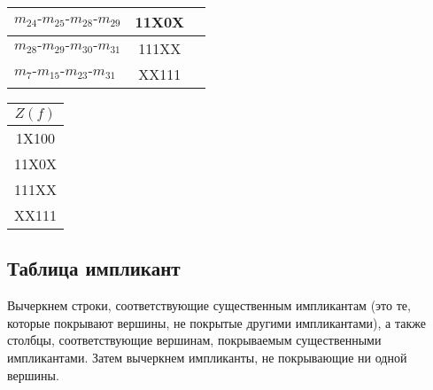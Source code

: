 \documentclass{article}
\begin{document}
\begin{center}
\begin{tabular}[t]{|lcc|}
$m_{24}\mbox{-}m_{25}\mbox{-}m_{28}\mbox{-}m_{29}$ & 11X0X& \\\hline
$m_{28}\mbox{-}m_{29}\mbox{-}m_{30}\mbox{-}m_{31}$ & 111XX& \\$m_{7}\mbox{-}m_{15}\mbox{-}m_{23}\mbox{-}m_{31}$ & XX111& \\\hline
\end{tabular}
\begin{tabular}[t]{|c|}
\hline $Z(f)$ \\ \hline
1X100\\
11X0X\\
111XX\\
XX111\\
\hline \end{tabular}
\end{center}
\subsection*{Таблица импликант}
Вычеркнем строки, соответствующие существенным импликантам (это те, которые покрывают вершины, не покрытые другими импликантами), а также столбцы, соответствующие вершинам, покрываемым существенными импликантами. Затем вычеркнем импликанты, не покрывающие ни одной вершины.
\end{document}
